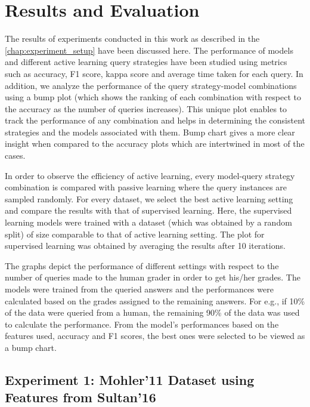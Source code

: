 

    \chapter{Results and Evaluation}

    The results of experiments conducted in this work as described in the \autoref{chap:experiment_setup} have been discussed here. The performance of models and different active learning query strategies have been studied using metrics such as accuracy, F1 score, kappa score and average time taken for each query. In addition, we analyze the performance of the query strategy-model combinations using a bump plot (which shows the ranking of each combination with respect to the accuracy as the number of queries increases). This unique plot enables to track the performance of any combination and helps in determining the consistent strategies and the models associated with them. Bump chart gives a more clear insight when compared to the accuracy plots which are intertwined in most of the cases.
    
    In order to observe the efficiency of active learning, every model-query strategy combination is compared with passive learning where the query instances are sampled randomly. For every dataset, we select the best active learning setting and compare the results with that of supervised learning. Here, the supervised learning models were trained with a dataset (which was obtained by a random split) of size comparable to that of active learning setting. The plot for supervised learning was obtained by averaging the results after 10 iterations. 
    
    The graphs depict the performance of different settings with respect to the number of queries made to the human grader in order to get his/her grades. The models were trained from the queried answers and the performances were calculated based on the grades assigned to the remaining answers. For e.g., if 10\% of the data were queried from a human, the remaining 90\% of the data was used to calculate the performance. From the model's performances based on the features used, accuracy and F1 scores, the best ones were selected to be viewed as a bump chart.
    
    \section{Experiment 1: Mohler'11 Dataset using Features from Sultan'16}
	
